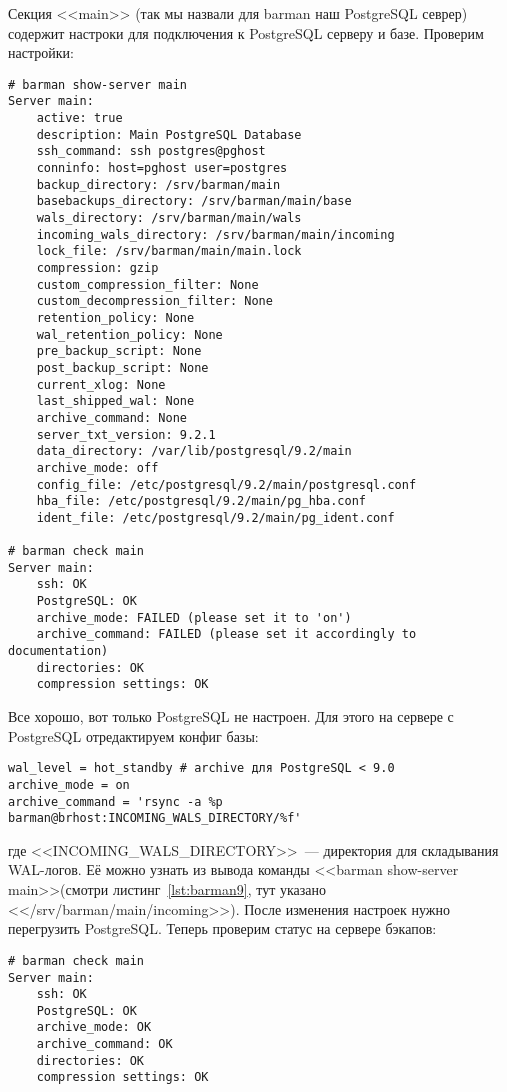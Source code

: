 Секция <<main>> (так мы назвали для barman наш PostgreSQL севрер) содержит настроки для подключения к PostgreSQL серверу и базе. Проверим настройки:

\begin{lstlisting}[label=lst:barman9,caption=Проверка barman настроек]
# barman show-server main
Server main:
	active: true
	description: Main PostgreSQL Database
	ssh_command: ssh postgres@pghost
	conninfo: host=pghost user=postgres
	backup_directory: /srv/barman/main
	basebackups_directory: /srv/barman/main/base
	wals_directory: /srv/barman/main/wals
	incoming_wals_directory: /srv/barman/main/incoming
	lock_file: /srv/barman/main/main.lock
	compression: gzip
	custom_compression_filter: None
	custom_decompression_filter: None
	retention_policy: None
	wal_retention_policy: None
	pre_backup_script: None
	post_backup_script: None
	current_xlog: None
	last_shipped_wal: None
	archive_command: None
	server_txt_version: 9.2.1
	data_directory: /var/lib/postgresql/9.2/main
	archive_mode: off
	config_file: /etc/postgresql/9.2/main/postgresql.conf
	hba_file: /etc/postgresql/9.2/main/pg_hba.conf
	ident_file: /etc/postgresql/9.2/main/pg_ident.conf

# barman check main
Server main:
	ssh: OK
	PostgreSQL: OK
	archive_mode: FAILED (please set it to 'on')
	archive_command: FAILED (please set it accordingly to documentation)
	directories: OK
	compression settings: OK
\end{lstlisting}

Все хорошо, вот только PostgreSQL не настроен. Для этого на сервере с PostgreSQL отредактируем конфиг базы:

\begin{lstlisting}[label=lst:barman10,caption=Настройка PostgreSQL]
wal_level = hot_standby # archive для PostgreSQL < 9.0
archive_mode = on
archive_command = 'rsync -a %p barman@brhost:INCOMING_WALS_DIRECTORY/%f'
\end{lstlisting}

где <<INCOMING\_WALS\_DIRECTORY>>~--- директория для складывания WAL-логов. Её можно узнать из вывода команды <<barman show-server main>>(смотри листинг~\ref{lst:barman9}, тут указано  <</srv/barman/main/incoming>>). После изменения настроек нужно перегрузить PostgreSQL. Теперь проверим статус на сервере бэкапов:

\begin{lstlisting}[label=lst:barman11,caption=Проверка]
# barman check main
Server main:
	ssh: OK
	PostgreSQL: OK
	archive_mode: OK
	archive_command: OK
	directories: OK
	compression settings: OK
\end{lstlisting}


